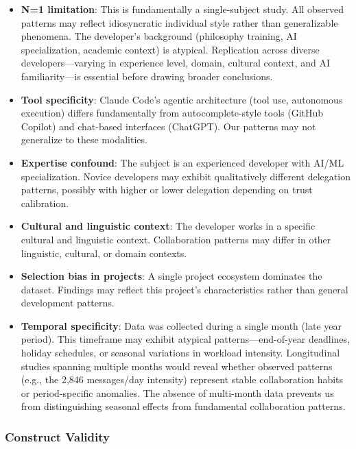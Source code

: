 \documentclass{ntlabs-preprint}
\begin{document}
\begin{itemize}
    \item \textbf{N=1 limitation}: This is fundamentally a single-subject study. All observed patterns may reflect idiosyncratic individual style rather than generalizable phenomena. The developer's background (philosophy training, AI specialization, academic context) is atypical. Replication across diverse developers---varying in experience level, domain, cultural context, and AI familiarity---is essential before drawing broader conclusions.

    \item \textbf{Tool specificity}: Claude Code's agentic architecture (tool use, autonomous execution) differs fundamentally from autocomplete-style tools (GitHub Copilot) and chat-based interfaces (ChatGPT). Our patterns may not generalize to these modalities.

    \item \textbf{Expertise confound}: The subject is an experienced developer with AI/ML specialization. Novice developers may exhibit qualitatively different delegation patterns, possibly with higher or lower delegation depending on trust calibration.

    \item \textbf{Cultural and linguistic context}: The developer works in a specific cultural and linguistic context. Collaboration patterns may differ in other linguistic, cultural, or domain contexts.

    \item \textbf{Selection bias in projects}: A single project ecosystem dominates the dataset. Findings may reflect this project's characteristics rather than general development patterns.

    \item \textbf{Temporal specificity}: Data was collected during a single month (late year period). This timeframe may exhibit atypical patterns---end-of-year deadlines, holiday schedules, or seasonal variations in workload intensity. Longitudinal studies spanning multiple months would reveal whether observed patterns (e.g., the 2,846 messages/day intensity) represent stable collaboration habits or period-specific anomalies. The absence of multi-month data prevents us from distinguishing seasonal effects from fundamental collaboration patterns.
\end{itemize}

\subsubsection{Construct Validity}
\end{document}
